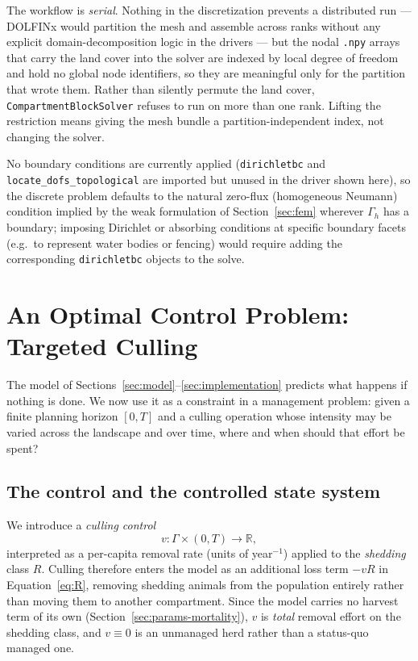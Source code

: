 \documentclass[11pt]{article}
\begin{document}
The workflow is \emph{serial}. Nothing in the discretization prevents a distributed run --- DOLFINx would partition the mesh and assemble across ranks without any explicit domain-decomposition logic in the drivers --- but the nodal \texttt{.npy} arrays that carry the land cover into the solver are indexed by local degree of freedom and hold no global node identifiers, so they are meaningful only for the partition that wrote them. Rather than silently permute the land cover, \texttt{CompartmentBlockSolver} refuses to run on more than one rank. Lifting the restriction means giving the mesh bundle a partition-independent index, not changing the solver.

No boundary conditions are currently applied (\texttt{dirichletbc} and \texttt{locate\_dofs\_topological} are imported but unused in the driver shown here), so the discrete problem defaults to the natural zero-flux (homogeneous Neumann) condition implied by the weak formulation of Section~\ref{sec:fem} wherever $\Gamma_h$ has a boundary; imposing Dirichlet or absorbing conditions at specific boundary facets (e.g.\ to represent water bodies or fencing) would require adding the corresponding \texttt{dirichletbc} objects to the solve.

\section{An Optimal Control Problem: Targeted Culling}
\label{sec:control}

The model of Sections~\ref{sec:model}--\ref{sec:implementation} predicts what happens if nothing is done. We now use it as a constraint in a management problem: given a finite planning horizon $[0,T]$ and a culling operation whose intensity may be varied across the landscape and over time, where and when should that effort be spent?

\subsection{The control and the controlled state system}

We introduce a \emph{culling control}
\[
v : \Gamma\times(0,T) \longrightarrow \mathbb{R},
\]
interpreted as a per-capita removal rate (units of year$^{-1}$) applied to the \emph{shedding} class $R$. Culling therefore enters the model as an additional loss term $-vR$ in Equation~\eqref{eq:R}, removing shedding animals from the population entirely rather than moving them to another compartment. Since the model carries no harvest term of its own (Section~\ref{sec:params-mortality}), $v$ is \emph{total} removal effort on the shedding class, and $v\equiv 0$ is an unmanaged herd rather than a status-quo managed one.
\end{document}
